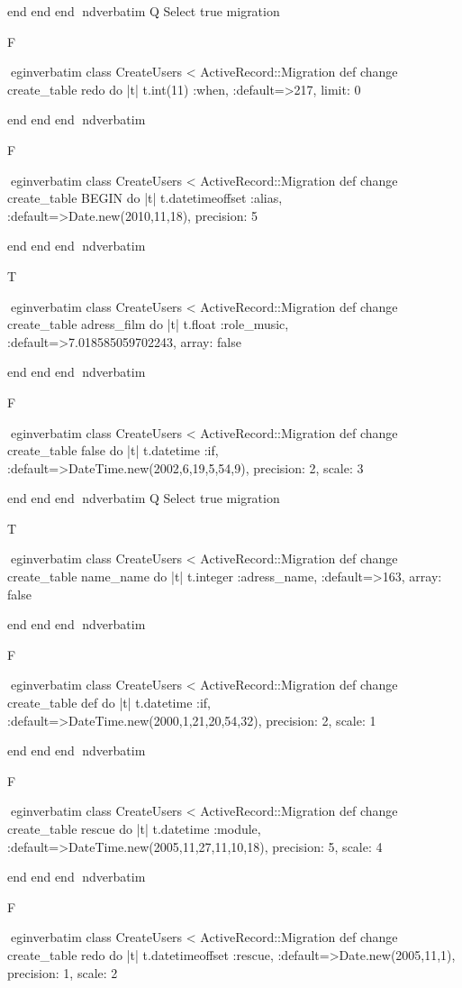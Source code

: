     end 
  end 
end
nd{verbatim}
Q
 Select true migration

F

egin{verbatim}
 class CreateUsers < ActiveRecord::Migration 
  def change 
    create_table redo do |t| 
      t.int(11) :when, :default=>217, limit: 0
    
    end 
  end 
end
nd{verbatim}

F

egin{verbatim}
 class CreateUsers < ActiveRecord::Migration 
  def change 
    create_table BEGIN do |t| 
      t.datetimeoffset :alias, :default=>Date.new(2010,11,18), precision: 5
    
    end 
  end 
end
nd{verbatim}

T

egin{verbatim}
 class CreateUsers < ActiveRecord::Migration 
  def change 
    create_table adress_film do |t| 
      t.float :role_music, :default=>7.018585059702243, array: false
    
    end 
  end 
end
nd{verbatim}

F

egin{verbatim}
 class CreateUsers < ActiveRecord::Migration 
  def change 
    create_table false do |t| 
      t.datetime :if, :default=>DateTime.new(2002,6,19,5,54,9), precision: 2, scale: 3
    
    end 
  end 
end
nd{verbatim}
Q
 Select true migration

T

egin{verbatim}
 class CreateUsers < ActiveRecord::Migration 
  def change 
    create_table name_name do |t| 
      t.integer :adress_name, :default=>163, array: false
    
    end 
  end 
end
nd{verbatim}

F

egin{verbatim}
 class CreateUsers < ActiveRecord::Migration 
  def change 
    create_table def do |t| 
      t.datetime :if, :default=>DateTime.new(2000,1,21,20,54,32), precision: 2, scale: 1
    
    end 
  end 
end
nd{verbatim}

F

egin{verbatim}
 class CreateUsers < ActiveRecord::Migration 
  def change 
    create_table rescue do |t| 
      t.datetime :module, :default=>DateTime.new(2005,11,27,11,10,18), precision: 5, scale: 4
    
    end 
  end 
end
nd{verbatim}

F

egin{verbatim}
 class CreateUsers < ActiveRecord::Migration 
  def change 
    create_table redo do |t| 
      t.datetimeoffset :rescue, :default=>Date.new(2005,11,1), precision: 1, scale: 2
    
